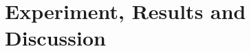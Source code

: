 \chapter{Experiment, Results and Discussion}
    
    \clearpage

    
    \clearpage

    
    \clearpage

    
    \clearpage

